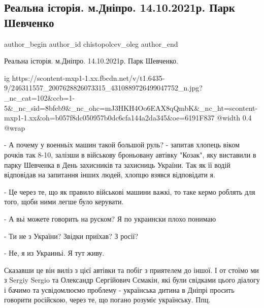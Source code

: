  
 
 
 
 
 
\subsection{Реальна історія. м.Дніпро. 14.10.2021р. Парк Шевченко}
\label{sec:16_10_2021.fb.chistopolcev_oleg.1.istoria_park_shevchenko_mova_rebenok}
 
\ifcmt
 author_begin
   author_id chistopolcev_oleg
 author_end
\fi

Реальна історія. м.Дніпро. 14.10.2021р. Парк Шевченко.

\ifcmt
  ig https://scontent-mxp1-1.xx.fbcdn.net/v/t1.6435-9/246311557_2007628826073315_4310889726499047752_n.jpg?_nc_cat=102&ccb=1-5&_nc_sid=8bfeb9&_nc_ohc=mJ3HKH4Oo6EAX8qQmbK&_nc_ht=scontent-mxp1-1.xx&oh=b057f8dc050957b0dc6cfa144a2da345&oe=6191F837
  @width 0.4
  @wrap 
\fi

- А почему у военньіх машин такой большой руль? - запитав хлопець віком рочків
так 8-10, залізши в військову броньовану автівку "Козак", яку виставили в парку
Шевченка в День захисників та захисниць України. Так як її водій відповідав на
запитання інших людей, хлопцю взявся відповідати я.

 - Це через те, що як правило військові машини важкі, то таке кермо роблять для
 того, щоби ними легше було керувати.

- А вьі можете говорить на руском? Я по украински плохо понимаю

- Ти не з України? Звідки приїхав? З росії?

- Не, я из Украиньі. Я тут живу.

Сказавши це він виліз з цієї автівки та побіг з приятелем до іншої. І от стоїмо
ми з Sergiy Sergio та Олександр Сергійович Сємакін, які були свідками цього
діалогу і бачимо та усвідомлюємо проблему - українська дитина в Дніпрі просить
говорити російскою, через те, що погано розуміє українську. Ппц.

